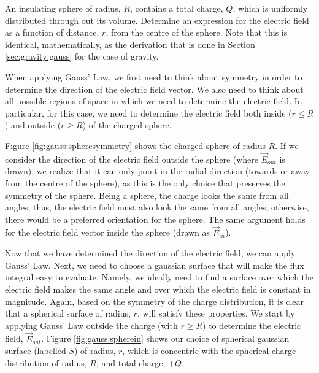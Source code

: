 \begin{example}{An insulating sphere of radius, $R$, contains a total charge, $Q$, which is uniformly distributed through out its volume. Determine an expression for the electric field as a function of distance, $r$, from the centre of the sphere.}
Note that this is identical, mathematically, as the derivation that is done in Section \ref{sec:gravity:gauss} for the case of gravity. 

When applying Gauss' Law, we first need to think about symmetry in order to determine the direction of the electric field vector. We also need to think about all possible regions of space in which we need to determine the electric field. In particular, for this case, we need to determine the electric field both inside ($r\leq R$) and outside ($r\geq R$) of the charged sphere.

Figure \ref{fig:gauss:spheresymmetry} shows the charged sphere of radius $R$. If we consider the direction of the electric field outside the sphere (where $\vec E_{out}$ is drawn), we realize that it can only point in the radial direction (towards or away from the centre of the sphere), as this is the only choice that preserves the symmetry of the sphere. Being a sphere, the charge looks the same from all angles; thus, the electric field must also look the same from all angles, otherwise, there would be a preferred orientation for the sphere. The same argument holds for the electric field vector inside the sphere (drawn as $\vec E_{in}$). 

Now that we have determined the direction of the electric field, we can apply Gauss' Law. Next, we need to choose a gaussian surface that will make the flux integral easy to evaluate. Namely, we ideally need to find a surface over which the electric field makes the same angle and over which the electric field is constant in magnitude. Again, based on the symmetry of the charge distribution, it is clear that a spherical surface of radius, $r$, will satisfy these properties. We start by applying Gauss' Law outside the charge (with $r\geq R$) to determine the electric field, $\vec E_{out}$. Figure \ref{fig:gauss:spherein} shows our choice of spherical gaussian surface (labelled $S$) of radius, $r$, which is concentric with the spherical charge distribution of radius, $R$, and total charge, $+Q$.


\end{example}
